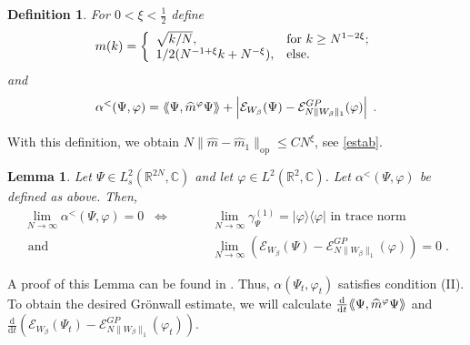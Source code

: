 \documentclass[11pt, english, american]{article}
\newcommand{\laa}{\langle\hspace{-0.08cm}\langle}
\newcommand{\raa}{\rangle\hspace{-0.08cm}\rangle}
\newcommand{\dt}{\frac{\text{d}}{\text{d}t}}
\newtheorem{lemma}[theorem]{Lemma}
\newtheorem{definition}[theorem] {Definition}
\renewcommand{\phi}{\varphi}
\begin{document}
\begin{definition}\label{defm}
For $0<\xi <\frac{1}{2}$ define
$$m(k)=\left\{
         \begin{array}{ll}
           \sqrt{k/N}, & \hbox{for $k\geq N^{1-2\xi}$;} \\
           1/2(N^{-1+\xi}k+N^{-\xi}), & \hbox{else.}
         \end{array}
       \right.
$$
and
$$\alpha^<(\Psi,\phi)=\laa\Psi,\widehat{m}^\phi\Psi\raa+\left|\mathcal{E}_{W_\beta}(\Psi)-\mathcal{E}_{N \|W_\beta\|_1}^{GP}(\phi)\right|\;.$$
\end{definition}
With this definition, we obtain
$N \|\widehat{m}-\widehat{m}_1\|_{\text{op}} \leq C N^{\xi}$, see \eqref{estab}.


\begin{lemma}\label{equiv}
Let $\Psi \in L^2_s(\mathbb{R}^{2N},\mathbb{C})$ and let $\phi \in L^2(\mathbb{R}^2,\mathbb{C})$.
Let $\alpha^<(\Psi,\phi)$ be defined as above. Then,
\begin{align*}\lim_{N\to\infty}\alpha^<(\Psi,\phi)=0 \;\;\Leftrightarrow \hspace{1cm}&\lim_{N\to\infty}\gamma^{(1)}_{\Psi}=|\phi\rangle\langle\phi|\text{ in trace norm}\\\text{ and }&\lim_{N\to\infty}(\mathcal{E}_{W_\beta}(\Psi)-\mathcal{E}_{N \|W_\beta\|_1}^{GP}(\phi))=0\;.
\end{align*}
\end{lemma}
A proof of this Lemma can be found in \cite{picklgp3d}.
Thus, $\alpha(\Psi_t,\phi_t)$ satisfies condition (II). 
To obtain the desired  Gr\"onwall estimate, we will calculate
$\dt \laa\Psi,\widehat{m}^\phi\Psi\raa$ and $ \dt (
\mathcal{E}_{W_\beta}(\Psi_t)-\mathcal{E}_{N \|W_\beta\|_1}^{GP}(\phi_t)
)$.
\end{document}
